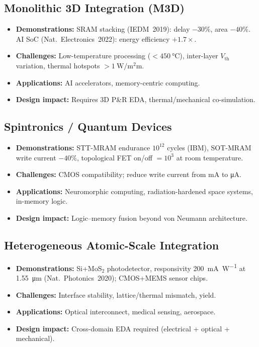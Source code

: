 \documentclass[conference]{IEEEtran}
\begin{document}
\subsection{Monolithic 3D Integration (M3D)}
\begin{itemize}
  \item \textbf{Demonstrations:} SRAM stacking (IEDM~2019): delay $-30\%$, area $-40\%$. AI SoC (Nat.~Electronics~2022): energy efficiency $+1.7\times$.
  \item \textbf{Challenges:} Low-temperature processing ($<\SI{450}{\celsius}$), inter-layer $V_\mathrm{th}$ variation, thermal hotspots $>\SI{1}{\watt\per\square\milli\meter}$.
  \item \textbf{Applications:} AI accelerators, memory-centric computing.
  \item \textbf{Design impact:} Requires 3D P\&R EDA, thermal/mechanical co-simulation.
\end{itemize}

\subsection{Spintronics / Quantum Devices}
\begin{itemize}
  \item \textbf{Demonstrations:} STT-MRAM endurance $10^{12}$ cycles (IBM), SOT-MRAM write current $-40\%$, topological FET on/off $=10^3$ at room temperature.
  \item \textbf{Challenges:} CMOS compatibility; reduce write current from mA to \si{\micro\ampere}.
  \item \textbf{Applications:} Neuromorphic computing, radiation-hardened space systems, in-memory logic.
  \item \textbf{Design impact:} Logic–memory fusion beyond von Neumann architecture.
\end{itemize}

\subsection{Heterogeneous Atomic-Scale Integration}
\begin{itemize}
  \item \textbf{Demonstrations:} Si+MoS$_2$ photodetector, responsivity \SI{200}{\milli\ampere\per\watt} at \SI{1.55}{\micro\meter} (Nat.~Photonics~2020); CMOS+MEMS sensor chips.
  \item \textbf{Challenges:} Interface stability, lattice/thermal mismatch, yield.
  \item \textbf{Applications:} Optical interconnect, medical sensing, aerospace.
  \item \textbf{Design impact:} Cross-domain EDA required (electrical + optical + mechanical).
\end{itemize}
\end{document}
